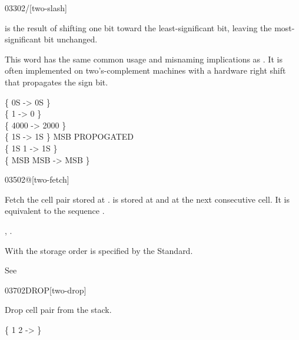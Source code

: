 \begin{worddef}{0330}{2/}[two-slash]
\item {}

	 is the result of shifting  one bit toward
	the least-significant bit, leaving the most-significant bit
	unchanged.

	\begin{defer}
	\rationale %
		This word has the same common usage and misnaming implications
		as . It is often implemented on two's-complement
		machines with a hardware right shift that propagates the sign
		bit.

	\testing
		\{ 0S		 -> 0S \} \\
		\{ 1		 -> 0 \} \\
		\{ 4000		 -> 2000 \} \\
		\{ 1S		 -> 1S \} \tab[4]  MSB PROPOGATED \\
		\{ 1S 1   -> 1S \} \\
		\{ MSB  MSB  -> MSB \}
	\end{defer}
\end{worddef}


\begin{worddef}{0350}{2@}[two-fetch]
\item {}

	Fetch the cell pair  stored at \param{a-addr}.
	 is stored at  and  at the
	next consecutive cell. It is equivalent to the sequence
	    \word{@}.

\see {},
	\wref{core:2!}{2!}.

	\begin{defer}
	\rationale %
		With  the storage order is specified by the Standard.

	\testing
		\rmfamily
		See \rref{core:,}{,}
	\end{defer}
\end{worddef}


\begin{worddef}{0370}{2DROP}[two-drop]
\item {}

	Drop cell pair  from the stack.

	\begin{defer}
	\testing
		\{ 1 2  -> \}
	\end{defer}
\end{worddef}


